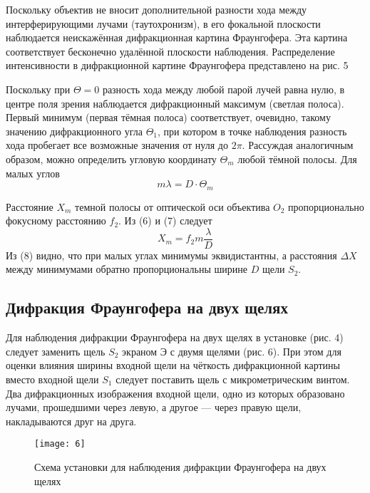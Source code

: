 \documentclass[a4paper, 12pt]{article}
\begin{document}
Поскольку объектив не вносит дополнительной разности хода 
между интерферирующими лучами
(таутохронизм), в его фокальной плоскости наблюдается неискажённая
дифракционная картина Фраунгофера. Эта картина соответствует
бесконечно удалённой плоскости наблюдения. Распределение интенсивности
в дифракционной картине Фраунгофера представлено на рис. 5 

Поскольку при $\Theta = 0$ разность хода между любой парой лучей равна
нулю, в центре поля зрения наблюдается дифракционный максимум (светлая
полоса). Первый минимум (первая тёмная полоса) соответствует,
очевидно, такому значению дифракционного угла $\Theta_1$, при котором в точке
наблюдения разность хода пробегает все возможные значения от нуля до
$2\pi$. Рассуждая аналогичным образом, можно определить угловую
координату $\Theta_m$ любой тёмной полосы. Для малых углов
\begin{equation}
    m\lambda = D \cdot \Theta_m
\end{equation}

Расстояние $X_m$ темной полосы от оптической оси объектива $O_2$
пропорционально фокусному расстоянию $f_2$. Из (6) и (7) следует 
\begin{equation}
    X_m = f_2 m \frac{\lambda}{D}
\end{equation}
Из (8) видно, что при малых углах минимумы эквидистантны, а расстояния
$\Delta X$ между минимумами обратно пропорциональны ширине $D$ щели
$S_2$.


\subsection*{Дифракция Фраунгофера на двух щелях}
Для наблюдения дифракции Фраунгофера на двух щелях в установке (рис.
4) следует заменить щель $S_2$ экраном Э с двумя щелями (рис. 6). При
этом для оценки влияния ширины входной щели на чёткость дифракционной
картины вместо входной щели $S_1$ следует поставить щель с
микрометрическим винтом. Два дифракционных изображения входной щели,
одно из которых образовано лучами, прошедшими через левую, а другое —
через правую щели, накладываются друг на друга.


\begin{figure}[H]
    \texttt{[image: 6]} 
    \caption{Схема установки для наблюдения дифракции Фраунгофера на
    двух щелях}
\end{figure}
\end{document}
